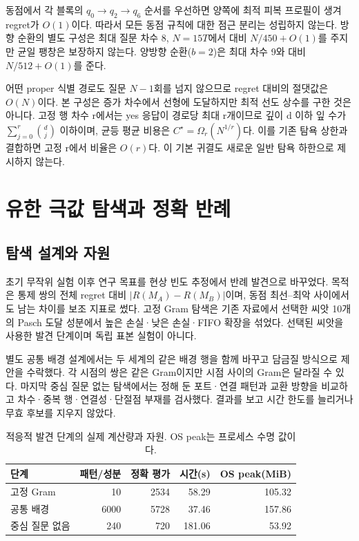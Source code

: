 \documentclass[11pt,a4paper]{article}
\theoremstyle{definition}
\theoremstyle{remark}\newtheorem{remark}[theorem]{주석}
\newcommand{\Opt}{C^{\star}}
\newcommand{\Reg}{R}
\begin{document}
동점에서 각 블록의 $q_0\to q_2\to q_6$ 순서를 우선하면 양쪽에 최적 피복 프로필이 생겨 regret가 $O(1)$이다. 따라서 모든 동점 규칙에 대한 점근 분리는 성립하지 않는다. 방향 순환의 별도 구성은 최대 질문 차수 8, $N=15T$에서 대비 $N/450+O(1)$를 주지만 균일 팽창은 보장하지 않는다. 양방향 순환($b=2$)은 최대 차수 9와 대비 $N/512+O(1)$를 준다.

어떤 proper 식별 경로도 질문 $N-1$회를 넘지 않으므로 regret 대비의 절댓값은 $O(N)$이다. 본 구성은 증가 차수에서 선형에 도달하지만 최적 선도 상수를 구한 것은 아니다. 고정 행 차수 r에서는 yes 응답이 경로당 최대 r개이므로 깊이 d 이하 잎 수가 $\sum_{j=0}^r\binom dj$ 이하이며, 균등 평균 비용은 $\Opt=\Omega_r(N^{1/r})$다. 이를 기존 탐욕 상한\cite{llm}과 결합하면 고정 r에서 비율은 $O(r)$다. 이 기본 귀결도 새로운 일반 탐욕 하한으로 제시하지 않는다.

\section{유한 극값 탐색과 정확 반례}\label{sec:extremal}
\subsection{탐색 설계와 자원}
초기 무작위 실험 이후 연구 목표를 현상 빈도 추정에서 반례 발견으로 바꾸었다. 목적은 통제 쌍의 전체 regret 대비 $|\Reg(M_A)-\Reg(M_B)|$이며, 동점 최선--최악 사이에서도 남는 차이를 보조 지표로 썼다. 고정 Gram 탐색은 기존 자료에서 선택한 씨앗 10개의 Pasch 도달 성분에서 높은 손실·낮은 손실·FIFO 확장을 섞었다. 선택된 씨앗을 사용한 발견 단계이며 독립 표본 실험이 아니다.

별도 공통 배경 설계에서는 두 세계의 같은 배경 행을 함께 바꾸고 담금질 방식으로 제안을 수락했다. 각 시점의 쌍은 같은 Gram이지만 시점 사이의 Gram은 달라질 수 있다. 마지막 중심 질문 없는 탐색에서는 정해 둔 포트·연결 패턴과 교환 방향을 비교하고 차수·중복 행·연결성·단절점 부재를 검사했다. 결과를 보고 시간 한도를 늘리거나 무효 후보를 지우지 않았다.

\begin{table}[htbp]
\centering\small
\caption{적응적 발견 단계의 실제 계산량과 자원. OS peak는 프로세스 수명 값이다.}\label{tab:search}
\begin{tabular}{lrrrr}\toprule
단계 & 패턴/성분 & 정확 평가 & 시간(s) & OS peak(MiB)\\\midrule
고정 Gram & 10 & 2534 & 58.29 & 105.32\\
공통 배경 & 6000 & 5728 & 37.46 & 157.86\\
중심 질문 없음 & 240 & 720 & 181.06 & 53.92\\
\bottomrule\end{tabular}

\end{table}
\end{document}
